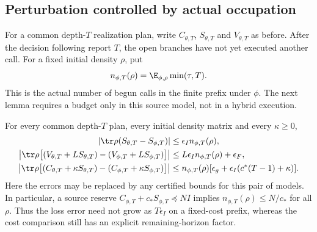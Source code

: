 \subsection{Perturbation controlled by actual occupation}
For a common depth-$T$ realization plan, write $C_{\theta,T}$, $S_{\theta,T}$ and $V_{\theta,T}$ as before. After the decision following report $T$, the open branches have not yet executed another call. For a fixed initial density $\rho$, put
\[
 n_{\phi,T}(\rho)=\E_{\phi,\rho}\min(\tau,T).
\]
This is the actual number of begun calls in the finite prefix under $\phi$. The next lemma requires a budget only in this source model, not in a hybrid execution.

\begin{lemma}\label{lem:occupation-perturbation}
For every common depth-$T$ plan, every initial density matrix and every $\kappa\ge0$,
\begin{align}
 |\tr\rho(S_{\theta,T}-S_{\phi,T})|
 &\le\epsilon_I n_{\phi,T}(\rho),\label{eq:prefix-survival-error}\\
 \left|\tr\rho\bigl[(V_{\theta,T}+LS_{\theta,T})
                   -(V_{\phi,T}+LS_{\phi,T})\bigr]\right|
 &\le L\epsilon_I n_{\phi,T}(\rho)+\epsilon_F,\label{eq:prefix-risk-error}\\
 \left|\tr\rho\bigl[(C_{\theta,T}+\kappa S_{\theta,T})
                   -(C_{\phi,T}+\kappa S_{\phi,T})\bigr]\right|
 &\le n_{\phi,T}(\rho)
       [\epsilon_g+\epsilon_I(c^*(T-1)+\kappa)].\label{eq:prefix-cost-error}
\end{align}
Here the errors may be replaced by any certified bounds for this pair of models. In particular, a source reserve $C_{\phi,T}+c_*S_{\phi,T}\preccurlyeq NI$ implies $n_{\phi,T}(\rho)\le N/c_*$ for all $\rho$. Thus the loss error need not grow as $T\epsilon_I$ on a fixed-cost prefix, whereas the cost comparison still has an explicit remaining-horizon factor.
\end{lemma}
